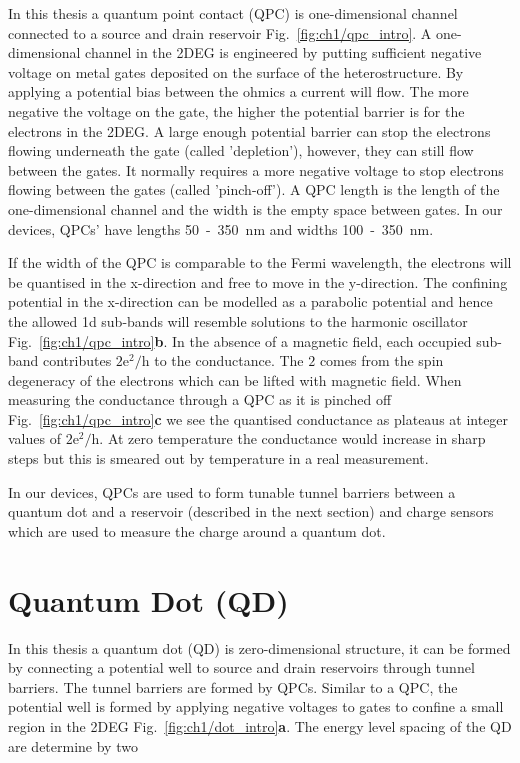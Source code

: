 In this thesis a quantum point contact (QPC) is one-dimensional channel connected to a source and drain reservoir Fig.~\ref{fig:ch1/qpc_intro}. A one-dimensional channel in the 2DEG is engineered by putting sufficient negative voltage on metal gates deposited on the surface of the heterostructure. By applying a potential bias between the ohmics a current will flow. The more negative the voltage on the gate, the higher the potential barrier is for the electrons in the 2DEG. A large enough potential barrier can stop the electrons flowing underneath the gate (called 'depletion'), however, they can still flow between the gates. It normally requires a more negative voltage to stop electrons flowing between the gates (called 'pinch-off'). A QPC length is the length of the one-dimensional channel and the width is the empty space between gates. In our devices, QPCs' have lengths 50~-~\qty{350}{nm} and widths 100~-~\qty{350}{nm}.

If the width of the QPC is comparable to the Fermi wavelength, the electrons will be quantised in the x-direction and free to move in the y-direction. The confining potential in the x-direction can be modelled as a parabolic potential and hence the allowed 1d sub-bands will resemble solutions to the harmonic oscillator Fig.~\ref{fig:ch1/qpc_intro}\textbf{b}. In the absence of a magnetic field, each occupied sub-band contributes $\mathrm{2e^2/h}$ to the conductance. The $2$ comes from the spin degeneracy of the electrons which can be lifted with magnetic field. When measuring the conductance through a QPC as it is pinched off Fig.~\ref{fig:ch1/qpc_intro}\textbf{c} we see the quantised conductance as plateaus at integer values of $\mathrm{2e^2/h}$. At zero temperature the conductance would increase in sharp steps but this is smeared out by temperature in a real measurement.

In our devices, QPCs are used to form tunable tunnel barriers between a quantum dot and a reservoir (described in the next section) and charge sensors which are used to measure the charge around a quantum dot. 



\section{Quantum Dot (QD)}

In this thesis a quantum dot (QD) is zero-dimensional structure, it can be formed by connecting a potential well to source and drain reservoirs through tunnel barriers. The tunnel barriers are formed by QPCs. Similar to a QPC, the potential well is formed by applying negative voltages to gates to confine a small region in the 2DEG Fig.~\ref{fig:ch1/dot_intro}\textbf{a}. The energy level spacing of the QD are determine by two 

